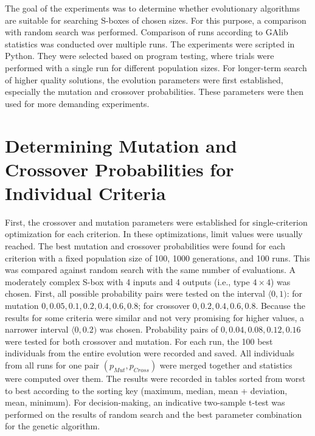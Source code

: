 %
%
%
%
%
%
The goal of the experiments was to determine whether evolutionary algorithms
are suitable for searching S-boxes of chosen sizes.
For this purpose, a comparison with random search was performed.
Comparison of runs according to GAlib statistics \cite{galib} was conducted over multiple runs.
The experiments were scripted in Python.
They were selected based on program testing, where trials were performed with a single run
for different population sizes. For longer-term search of higher quality solutions, the
evolution parameters were first established, especially the mutation and crossover probabilities.
These parameters were then used for more demanding experiments.

\section{Determining Mutation and Crossover Probabilities for Individual Criteria}
First, the crossover and mutation parameters were established for single-criterion
optimization for each criterion. In these optimizations, limit values were usually reached.
The best mutation and crossover probabilities were found for each criterion
with a fixed population size of 100, 1000 generations, and 100 runs.
This was compared against random search with the same number of evaluations.
A moderately complex S-box with 4 inputs and 4 outputs (i.e., type $4 \times 4$) was chosen.
First, all possible probability pairs were tested on the interval $\langle 0, 1)$:
for mutation $0, 0.05, 0.1, 0.2, 0.4, 0.6, 0.8$; for crossover $0, 0.2, 0.4, 0.6, 0.8$.
Because the results for some criteria were similar and not very promising for higher values,
a narrower interval $\langle0, 0.2)$ was chosen. Probability pairs of
$0, 0.04, 0.08, 0.12, 0.16$ were tested for both crossover and mutation.
For each run, the 100 best individuals from the entire evolution were recorded and saved.
All individuals from all runs for one pair $(p_{Mut}, p_{Cross})$ were merged
together and statistics were computed over them.
The results were recorded in tables sorted from worst to best
according to the sorting key (maximum, median, mean + deviation, mean, minimum).
For decision-making, an indicative two-sample t-test was performed on the results of random search
and the best parameter combination for the genetic algorithm.
